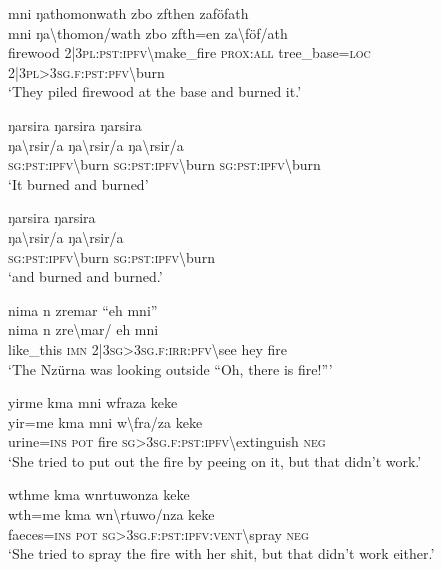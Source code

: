 \ea\label{ex:6:a1312}
mni ŋathomonwath zbo zfthen zaföfath\\
\gll mni	ŋa{\textbackslash}thomon/wath	zbo	zfth=en	za{\textbackslash}föf/ath\\
     firewood	2|3\textsc{pl}:\textsc{pst}:\textsc{ipfv}{\textbackslash}make\_fire	\textsc{prox}:\textsc{all}	tree\_base=\textsc{loc}	2|3\textsc{pl}>3\textsc{sg}.\textsc{f}:\textsc{pst}:\textsc{pfv}{\textbackslash}burn\\
\glt `They piled firewood at the base and burned it.'
\z

\ea\label{ex:6:a1314}
ŋarsira ŋarsira ŋarsira\\
\gll ŋa{\textbackslash}rsir/a	ŋa{\textbackslash}rsir/a	ŋa{\textbackslash}rsir/a\\
     \textsc{sg}:\textsc{pst}:\textsc{ipfv}{\textbackslash}burn	\textsc{sg}:\textsc{pst}:\textsc{ipfv}{\textbackslash}burn	\textsc{sg}:\textsc{pst}:\textsc{ipfv}{\textbackslash}burn\\
\glt `It burned and burned'
\z

\ea\label{ex:6:a1315}
ŋarsira ŋarsira\\
\gll ŋa{\textbackslash}rsir/a	ŋa{\textbackslash}rsir/a\\
     \textsc{sg}:\textsc{pst}:\textsc{ipfv}{\textbackslash}burn	\textsc{sg}:\textsc{pst}:\textsc{ipfv}{\textbackslash}burn\\
\glt `and burned and burned.'
\z

\ea\label{ex:6:a1316}
nima n zremar ``eh mni''\\
\gll nima	n	zre{\textbackslash}mar/	eh	mni\\
     like\_this	\textsc{imn}	2|3\textsc{sg}>3\textsc{sg}.\textsc{f}:\textsc{irr}:\textsc{pfv}{\textbackslash}see	hey	fire\\
\glt `The Nzürna was looking outside ``Oh, there is fire!'''
\z

\ea\label{ex:6:a1317}
yirme kma mni wfraza keke\\
\gll yir=me	kma	mni	w{\textbackslash}fra/za	keke\\
     urine=\textsc{ins}	\textsc{pot}	fire	\textsc{sg}>3\textsc{sg}.\textsc{f}:\textsc{pst}:\textsc{ipfv}{\textbackslash}extinguish	\textsc{neg}\\
\glt `She tried to put out the fire by peeing on it, but that didn't work.'
\z

\ea\label{ex:6:a1318}
wthme kma wnrtuwonza keke\\
\gll wth=me	kma	wn{\textbackslash}rtuwo/nza	keke\\
     faeces=\textsc{ins}	\textsc{pot}	\textsc{sg}>3\textsc{sg}.\textsc{f}:\textsc{pst}:\textsc{ipfv}:\textsc{vent}{\textbackslash}spray	\textsc{neg}\\
\glt `She tried to spray the fire with her shit, but that didn't work either.'
\z

